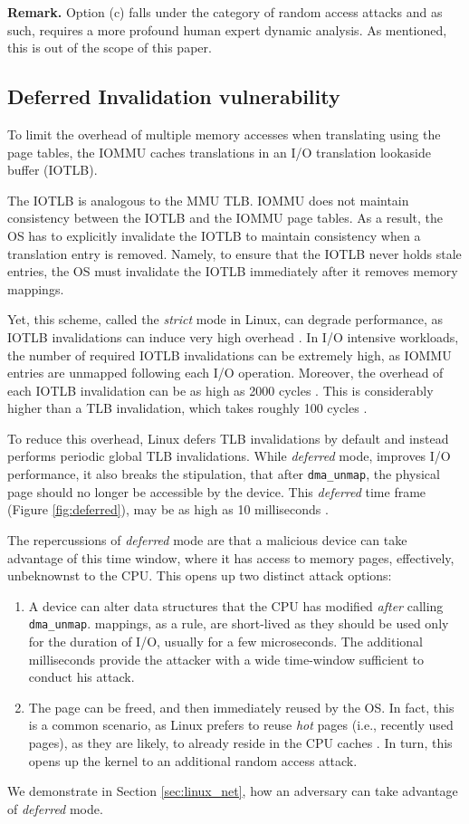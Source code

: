 \noindent\textbf{Remark.} Option (c) falls under the category of random access attacks and as such, requires a more profound human expert dynamic analysis. As mentioned, this is out of the scope of this paper.


\subsection{Deferred Invalidation vulnerability}\label{sec:deferred}

To limit the overhead of multiple memory accesses when translating \iova{} using the page tables, the IOMMU caches translations in an I/O translation lookaside buffer (IOTLB). 

The IOTLB is analogous to the MMU TLB. IOMMU does not maintain consistency between the IOTLB and the IOMMU page tables. As a result, the OS has to explicitly invalidate the IOTLB to maintain consistency when a translation entry is removed. Namely, to ensure that the IOTLB never holds stale entries, the OS must invalidate the IOTLB immediately after it removes memory mappings. 

Yet, this scheme, called the \emph{strict} mode in Linux, can degrade performance, as IOTLB invalidations can induce very high overhead \cite{MMT16,MSMT18,Peleg15}. In I/O intensive workloads, the number of required IOTLB invalidations can be extremely high, as IOMMU entries are unmapped following each I/O operation. Moreover, the overhead of each IOTLB invalidation can be as high as 2000 cycles \cite{ABYTS11}. This is considerably higher than a TLB invalidation, which takes roughly 100 cycles \cite{Han14}. 

To reduce this overhead, Linux defers TLB invalidations by default and instead performs periodic global TLB invalidations. While \emph{deferred} mode, improves I/O performance, it also breaks the stipulation, that after \texttt{dma\_unmap}, the physical page should no longer be accessible by the device. This \emph{deferred} time frame (Figure \ref{fig:deferred}), may be as high as 10 milliseconds \cite{MSMT18}.

The repercussions of \emph{deferred} mode are that a malicious device can take advantage of this time window, where it has access to memory pages, effectively, unbeknownst to the CPU. This opens up two distinct attack options:

\begin{enumerate}
    \item A device can alter data structures that the CPU has modified \emph{after} calling \texttt{dma\_unmap}.
    \iova{} mappings, as a rule, are short-lived as they should be used only for the duration of I/O, usually for a few microseconds. The additional milliseconds provide the attacker with a wide time-window sufficient to conduct his attack.
    \item The page can be freed, and then immediately reused by the OS. In fact, this is a common scenario, as Linux prefers to reuse \emph{hot} pages (i.e., recently used pages), as they are likely, to already reside in the CPU caches \cite{hotcold}. In turn, this opens up the kernel to an additional random access attack.
\end{enumerate}

We demonstrate in Section \ref{sec:linux_net}, how an adversary can take advantage of \emph{deferred} mode.
